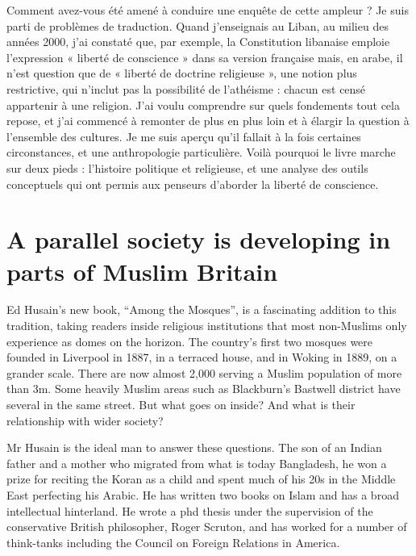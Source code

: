 Comment avez-vous été amené à conduire une enquête de cette ampleur ?
Je suis parti de problèmes de traduction. Quand j’enseignais au Liban, au milieu des années 2000, j’ai constaté que, par exemple, la Constitution libanaise emploie l’expression « liberté de conscience » dans sa version française mais, en arabe, il n’est question que de « liberté de doctrine  religieuse », une notion plus restrictive, qui n’inclut pas la possibilité de l’athéisme : chacun est censé appartenir à une religion. J’ai voulu comprendre sur quels fondements tout cela repose, et j’ai commencé à remonter de plus en plus loin et à élargir la question à l’ensemble des cultures. Je me suis aperçu qu’il fallait à la fois certaines circonstances, et une anthropologie particulière. Voilà pourquoi le livre marche sur deux pieds : l’histoire  politique et religieuse, et une analyse des outils conceptuels qui ont permis aux penseurs d’aborder la liberté de conscience.
 
\section{A parallel society is developing in parts of Muslim Britain}


Ed Husain’s new book, “Among the Mosques”, is a fascinating addition to this tradition, taking readers inside religious institutions that most non-Muslims only experience as domes on the horizon. The country’s first two mosques were founded in Liverpool in 1887, in a terraced house, and in Woking in 1889, on a grander scale. There are now almost 2,000 serving a Muslim population of more than 3m. Some heavily Muslim areas such as Blackburn’s Bastwell district have several in the same street. But what goes on inside? And what is their relationship with wider society?

Mr Husain is the ideal man to answer these questions. The son of an Indian father and a mother who migrated from what is today Bangladesh, he won a prize for reciting the Koran as a child and spent much of his 20s in the Middle East perfecting his Arabic. He has written two books on Islam and has a broad intellectual hinterland. He wrote a phd thesis under the supervision of the conservative British philosopher, Roger Scruton, and has worked for a number of think-tanks including the Council on Foreign Relations in America.



